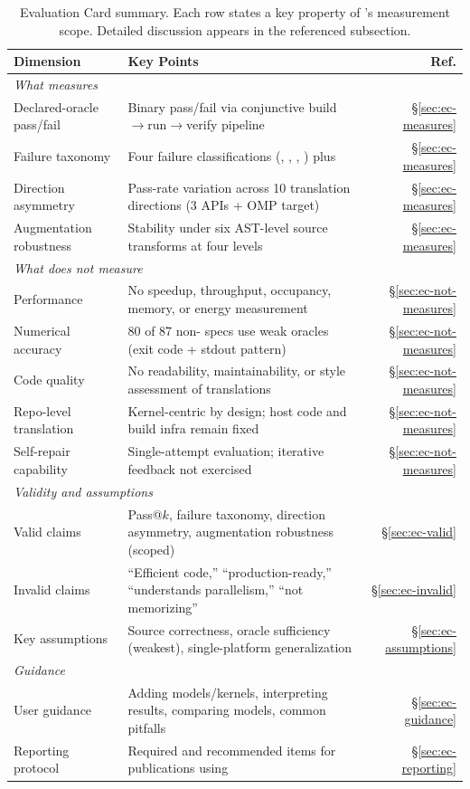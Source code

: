 \begin{table}[htbp]
\centering
\caption{Evaluation Card summary. Each row states a key property of \parbench{}'s
measurement scope. Detailed discussion appears in the referenced subsection.}
\label{tab:eval-card-summary}
\small
\begin{tabularx}{\textwidth}{@{}p{2.8cm}Xr@{}}
\toprule
Dimension & Key Points & Ref. \\
\midrule
\multicolumn{3}{l}{\textit{What \textnormal{\parbench{}} measures}} \\
Declared-oracle pass/fail & Binary pass/fail via conjunctive build$\to$run$\to$verify pipeline & \S\ref{sec:ec-measures} \\
Failure taxonomy & Four failure classifications (\extractionfail{}, \buildfail{}, \runfail{}, \verifyfail{}) plus \pass{} & \S\ref{sec:ec-measures} \\
Direction asymmetry & Pass-rate variation across 10 translation directions (3 APIs + OMP target) & \S\ref{sec:ec-measures} \\
Augmentation robustness & Stability under six AST-level source transforms at four levels & \S\ref{sec:ec-measures} \\
\midrule
\multicolumn{3}{l}{\textit{What \textnormal{\parbench{}} does not measure}} \\
Performance & No speedup, throughput, occupancy, memory, or energy measurement & \S\ref{sec:ec-not-measures} \\
Numerical accuracy & 80 of 87 non-\knownfail{} specs use weak oracles (exit code + stdout pattern) & \S\ref{sec:ec-not-measures} \\
Code quality & No readability, maintainability, or style assessment of translations & \S\ref{sec:ec-not-measures} \\
Repo-level translation & Kernel-centric by design; host code and build infra remain fixed & \S\ref{sec:ec-not-measures} \\
Self-repair capability & Single-attempt evaluation; iterative feedback not exercised & \S\ref{sec:ec-not-measures} \\
\midrule
\multicolumn{3}{l}{\textit{Validity and assumptions}} \\
Valid claims & Pass@$k$, failure taxonomy, direction asymmetry, augmentation robustness (scoped) & \S\ref{sec:ec-valid} \\
Invalid claims & ``Efficient code,'' ``production-ready,'' ``understands parallelism,'' ``not memorizing'' & \S\ref{sec:ec-invalid} \\
Key assumptions & Source correctness, oracle sufficiency (weakest), single-platform generalization & \S\ref{sec:ec-assumptions} \\
\midrule
\multicolumn{3}{l}{\textit{Guidance}} \\
User guidance & Adding models/kernels, interpreting results, comparing models, common pitfalls & \S\ref{sec:ec-guidance} \\
Reporting protocol & Required and recommended items for publications using \parbench{} & \S\ref{sec:ec-reporting} \\
\bottomrule
\end{tabularx}
\end{table}

